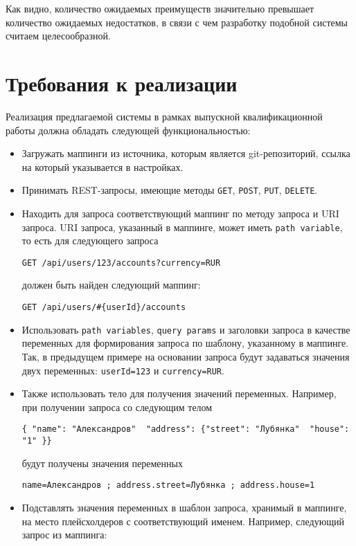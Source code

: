 Как видно, количество ожидаемых преимуществ значительно превышает количество ожидаемых недостатков, в связи с чем разработку подобной системы считаем целесообразной.


\section{Требования к реализации} \label{sec:requirements} %

Реализация предлагаемой системы в рамках выпускной квалификационной работы должна обладать следующей функциональностью:

\begin{itemize}
    \item Загружать маппинги из источника, которым является git-репозиторий, ссылка на который указывается в настройках.

    \item Принимать REST-запросы, имеющие методы \texttt{GET}, \texttt{POST}, \texttt{PUT}, \texttt{DELETE}.

    \item Находить для запроса соответствующий маппинг по методу запроса и URI запроса.
    URI запроса, указанный в маппинге, может иметь \texttt{path variable}, то есть для следующего запроса

    \texttt{GET /api/users/123/accounts?currency=RUR}

    должен быть найден следующий маппинг:

    \texttt{GET /api/users/\#\{userId\}/accounts}

    \item Использовать \texttt{path variables}, \texttt{query params} и заголовки запроса в качестве переменных для формирования запроса по шаблону, указанному в маппинге.
    Так, в предыдущем примере на основании запроса будут задаваться значения двух переменных: \texttt{userId=123} и \texttt{currency=RUR}.

    \item Также использовать тело для получения значений переменных.
    Например, при получении запроса со следующим телом

    \texttt{\{ "name": "Александров"\, "address": \{"street": "Лубянка"\, "house": "1" \}\}}

    будут получены значения переменных

    \texttt{name=Александров ; address.street=Лубянка ; address.house=1}

    \item Подставлять значения переменных в шаблон запроса, хранимый в маппинге, на место плейсхолдеров с соответствующий именем.
    Например, следующий запрос из маппинга:


\end{itemize}

